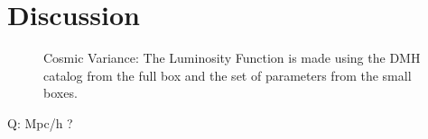 \section{Discussion}

\begin{figure}
\caption{Cosmic Variance: The Luminosity Function is made using the DMH catalog 
from the full box and the set of parameters from the small boxes.}
\label{graph_cosmic_variance}
\end{figure}

Q: Mpc/h ?